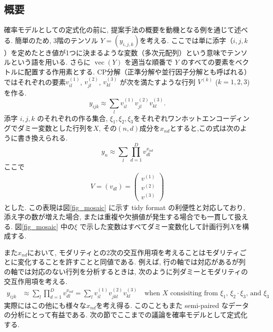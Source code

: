 \documentclass[a4paper,12ptc]{jsarticle} %
\begin{document}
\subsection{概要}
確率モデルとしての定式化の前に, 提案手法の概要を動機となる例を通じて述べる. 簡単のため, 3階のテンソル $Y=(y_{i,j,k})$を考える. ここでは単に添字（$i,j,k$）を定めたとき値が1つに決まるような変数（多次元配列）という意味でテンソルという語を用いる. さらに $\operatorname{vec}(Y)$ を適当な順番で $Y$ のすべての要素をベクトルに配置する作用素とする. 
CP分解（正準分解や並行因子分解とも呼ばれる）ではそれぞれの要素$v_{il}^{(1)}$, $v_{jl}^{(2)}$, $ v_{kl}^{(3)}$ が次を満たすような行列 $V^{(k)}$ ($k=1,2,3$)を作る.
\begin{equation*}
y_{ijk} \approx \sum_{l}v_{il}^{(1)} v_{jl}^{(2)} v_{kl}^{(3)}. 
\end{equation*}
添字 $i,j,k$ のそれぞれの作る集合, $\xi_1, \xi_2, \xi_3$をそれぞれワンホットエンコーディングでダミー変数とした行列を$X$, その$(n,d)$成分を$x_{nd}$とすると,この式は次のように書き換えられる.
\begin{equation}
y_{n} \approx \sum_{l}\prod_{d=1}^D v_{dl}^{x_{nd}} \label{eq_approx}
\end{equation}
ここで
\begin{align*}
V=(v_{dl})=\begin{pmatrix}
v^{(1)}\\
v^{(2)}\\
v^{(3)}
\end{pmatrix}
\end{align*}
とした. この表現は図\ref{fig_mosaic} に示す tidy format  \cite{Wickham2019} の利便性と対応しており, 添え字の数が増えた場合, または重複や欠損値が発生する場合でも一貫して扱える. 図\ref{fig_mosaic} 中の$\xi$ で示した変数はすべてダミー変数化して計画行列$X$を構成する.

また$x_{nd}$において, モダリティとの2次の交互作用項を考えることはモダリティごとに変化することを許すことと同値である. 
例えば, 行の軸では対応があるが列の軸では対応のない行列を分析するときは, 次のように列ダミーとモダリティの交互作用項を考える.
\begin{align*}
y_{ijk} &\approx \sum_{l}\prod_{d=1}^D v_{dl}^{x_{nd}} =\sum_{l}v_{il}^{(1)} v_{jkl}^{(2)} v_{kl}^{(3)} \quad \mbox{when $X$ consisiting from $\xi_1$, $\xi_2 \cdot \xi_3$, and $\xi_3$}
\end{align*}
実際にはこの他にも様々な$x_{nd}$を考え得る. このこともまた semi-paired なデータの分析にとって有益である. 次の節でここまでの議論を確率モデルとして定式化する.
\end{document}
